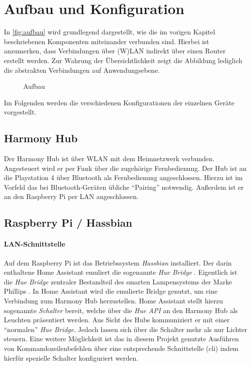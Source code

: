 \newpage
\section{Aufbau und Konfiguration}\label{sec:aufbau}
In \autoref{fig:aufbau} wird grundlegend dargestellt,
wie die im vorigen Kapitel beschriebenen Komponenten miteinander verbunden sind.
Hierbei ist anzumerken, dass Verbindungen über (W)LAN indirekt über einen Router erstellt werden.
Zur Wahrung der Übersichtlichkeit zeigt die Abbildung
 lediglich die abstrakten Verbindungen auf Anwendungsebene.

\begin{figure}[ht!]
    \centering
    \resizebox{\textwidth}{!}{
        
    }
    \caption{Aufbau}
    \label{fig:aufbau}
\end{figure}

Im Folgenden werden die verschiedenen Konfigurationen der einzelnen Geräte vorgestellt.

\subsection{Harmony Hub}\label{sec:aufbau-hub}
Der Harmony Hub ist über WLAN mit dem Heimnetzwerk verbunden.
Angesteuert wird er per Funk über die zugehörige Fernbedienung.
Der Hub ist an die Playstation 4 über Bluetooth als Fernbedienung angeschlossen.
Hierzu ist im Vorfeld das bei Bluetooth-Geräten übliche \enquote{Pairing} notwendig.
Außerdem ist er an den Raspberry Pi per LAN angeschlossen.

\subsection{Raspberry Pi / Hassbian}\label{sec:aufbau-hassbian}

\paragraph{LAN-Schnittstelle}
Auf dem Raspberry Pi ist das Betriebssystem \textit{Hassbian} installiert.
Der darin enthaltene Home Assistant emuliert die sogenannte \textit{Hue Bridge} \cite{Emulated83:online}.
Eigentlich ist die \textit{Hue Bridge} zentraler Bestandteil des smarten Lampensystems der Marke Phillips \cite{HueBridg65:online}.
In Home Assistant wird die emulierte Bridge genutzt, um eine Verbindung zum Harmony Hub herzustellen.
Home Assistant stellt hierzu sogenannte \textit{Schalter} bereit, welche über die \textit{Hue API} an den Harmony Hub als Leuchten präsentiert werden.
Aus Sicht des Hubs kommuniziert er mit einer \enquote{normalen} \textit{Hue Bridge}.
Jedoch lassen sich über die Schalter mehr als nur Lichter steuern.
Eine weitere Möglichkeit ist das in diesem Projekt genutzte Ausführen von Kommandozeilenbefehlen über eine entsprechende Schnittstelle (\ac{cli})
indem hierfür spezielle Schalter konfiguriert werden.

